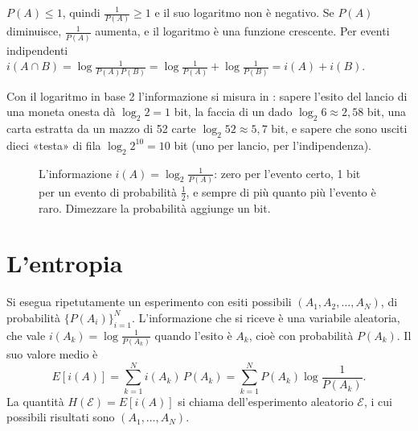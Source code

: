 \begin{dimostrazione}
 $P(A) \leq 1$, quindi $\frac{1}{P(A)} \geq 1$ e il suo logaritmo non è negativo.
 Se $P(A)$ diminuisce, $\frac{1}{P(A)}$ aumenta, e il logaritmo è una funzione crescente.
 Per eventi indipendenti
$i(A \cap B) = \log \frac{1}{P(A) P(B)} = \log \frac{1}{P(A)} + \log \frac{1}{P(B)} = i(A) + i(B)$.
\end{dimostrazione}

Con il logaritmo in base 2 l'informazione si misura in : sapere l'esito del lancio di una moneta onesta dà
$\log_2 2 = 1$ bit, la faccia di un dado $\log_2 6 \approx 2{,}58$ bit, una carta estratta da un mazzo di 52 carte
$\log_2 52 \approx 5{,}7$ bit, e sapere che sono usciti dieci «testa» di fila $\log_2 2^{10} = 10$ bit (uno per lancio,
per l'indipendenza).

\begin{figure}[H]
\centering
{}
\caption{L'informazione $i(A) = \log_2 \frac{1}{P(A)}$: zero per l'evento certo, 1 bit per un evento di probabilità
$\frac12$, e sempre di più quanto più l'evento è raro. Dimezzare la probabilità aggiunge un bit.}
\end{figure}

\section{L'entropia}

Si esegua ripetutamente un esperimento con esiti possibili $(A_1, A_2, \ldots, A_N)$, di probabilità
$\{P(A_i)\}_{i=1}^{N}$. L'informazione che si riceve è una variabile aleatoria, che vale $i(A_k) = \log \frac{1}{P(A_k)}$
quando l'esito è $A_k$, cioè con probabilità $P(A_k)$. Il suo valore medio è
\[ E[i(A)] = \sum_{k=1}^{N} i(A_k)\, P(A_k) = \sum_{k=1}^{N} P(A_k) \log \frac{1}{P(A_k)} . \]
La quantità $H(\mathcal{E}) = E[i(A)]$ si chiama  dell'esperimento aleatorio $\mathcal{E}$, i cui
possibili risultati sono $(A_1, \ldots, A_N)$.

